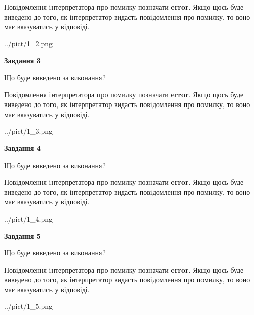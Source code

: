 \documentclass[12pt, ukrainian]{article}
\begin{document}
{\begin {large}
Повідомлення інтерпретатора про помилку позначати \textbf{error}.
Якщо щось буде виведено до того, як інтерпретатор видасть повідомлення про помилку, 
то воно має вказуватись у відповіді. \par


\begin{center}
	{../pict/1_2.png}
\end{center}
\newpage

{\begin {center}\textbf{Завдання 3}\end {center}}\par
Що буде виведено за виконання?

Повідомлення інтерпретатора про помилку позначати \textbf{error}.
Якщо щось буде виведено до того, як інтерпретатор видасть повідомлення про помилку, 
то воно має вказуватись у відповіді. \par


\begin{center}
	{../pict/1_3.png}
\end{center}
\newpage

{\begin {center}\textbf{Завдання 4}\end {center}}\par
Що буде виведено за виконання?

Повідомлення інтерпретатора про помилку позначати \textbf{error}.
Якщо щось буде виведено до того, як інтерпретатор видасть повідомлення про помилку, 
то воно має вказуватись у відповіді. \par


\begin{center}
	{../pict/1_4.png}
\end{center}
\newpage

{\begin {center}\textbf{Завдання 5}\end {center}}\par
Що буде виведено за виконання?

Повідомлення інтерпретатора про помилку позначати \textbf{error}.
Якщо щось буде виведено до того, як інтерпретатор видасть повідомлення про помилку, 
то воно має вказуватись у відповіді. \par


\begin{center}
	{../pict/1_5.png}
\end{center}
\newpage


\end{large}}
\end{document}
